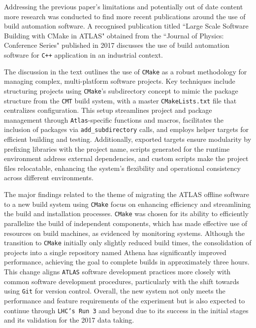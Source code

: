 Addressing the previous paper's limitations and potentially out of date content more research was conducted to find more recent publications around the use of build automation software. A recognised publication titled ``Large Scale Software Building with CMake in ATLAS" obtained from the ``Journal of Physics: Conference Series" published in 2017\cite{cmake_publication_2} discusses the use of build automation software for \texttt{C++} application in an industrial context. 

The discussion in the text outlines the use of \texttt{CMake} as a robust methodology for managing complex, multi-platform software projects. Key techniques include structuring projects using \texttt{CMake}'s subdirectory concept to mimic the package structure from the \texttt{CMT} build system, with a master \texttt{CMakeLists.txt} file that centralizes configuration. This setup streamlines project and package management through \texttt{Atlas}-specific functions and macros, facilitates the inclusion of packages via \texttt{add\_subdirectory} calls, and employs helper targets for efficient building and testing. Additionally, exported targets ensure modularity by prefixing libraries with the project name, scripts generated for the runtime environment address external dependencies, and custom scripts make the project files relocatable, enhancing the system’s flexibility and operational consistency across different environments.

The major findings related to the theme of migrating the ATLAS offline software to a new build system using \texttt{CMake} focus on enhancing efficiency and streamlining the build and installation processes. \texttt{CMake} was chosen for its ability to efficiently parallelize the build of independent components, which has made effective use of resources on build machines, as evidenced by monitoring systems. Although the transition to \texttt{CMake} initially only slightly reduced build times, the consolidation of projects into a single repository named Athena has significantly improved performance, achieving the goal to complete builds in approximately three hours. This change aligns \texttt{ATLAS} software development practices more closely with common software development procedures, particularly with the shift towards using \texttt{Git} for version control. Overall, the new system not only meets the performance and feature requirements of the experiment but is also expected to continue through \texttt{LHC's Run 3} and beyond due to its success in the initial stages and its validation for the 2017 data taking.

